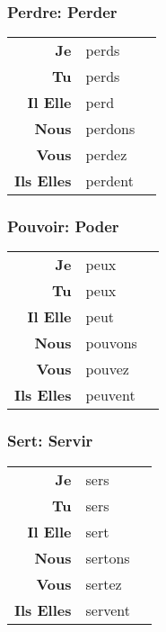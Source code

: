 \documentclass{subfiles}
\begin{document}
\begin{multicols}{3}
        \subsubsection{Perdre: Perder}
            \begin{tabular}{r l r}
                \textbf{Je}        & perds   &\\
                \textbf{Tu}        & perds   &\\
                \textbf{Il Elle}   & perd    &\\
                \textbf{Nous}      & perdons &\\
                \textbf{Vous}      & perdez  &\\
                \textbf{Ils Elles} & perdent &
            \end{tabular}

        \subsubsection{Pouvoir: Poder}
            \begin{tabular}{r l r}
                \textbf{Je}        & peux    &\\
                \textbf{Tu}        & peux    &\\
                \textbf{Il Elle}   & peut    &\\
                \textbf{Nous}      & pouvons &\\
                \textbf{Vous}      & pouvez  &\\
                \textbf{Ils Elles} & peuvent &
            \end{tabular}

        \subsubsection{Sert: Servir}
            \begin{tabular}{r l r}
                \textbf{Je}        & sers    &\\
                \textbf{Tu}        & sers    &\\
                \textbf{Il Elle}   & sert    &\\
                \textbf{Nous}      & sertons &\\
                \textbf{Vous}      & sertez  &\\
                \textbf{Ils Elles} & servent &
            \end{tabular}


\end{multicols}
\end{document}
